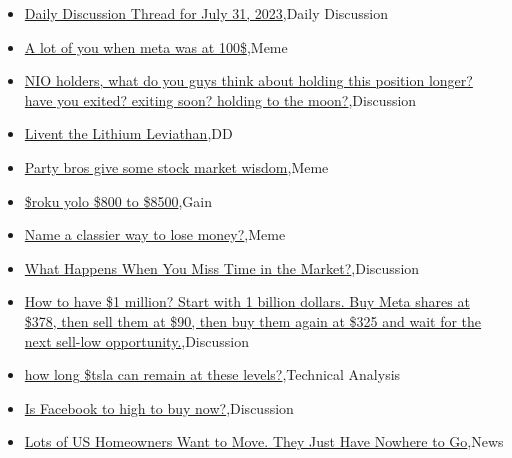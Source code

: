 \documentclass{article}%
\begin{document}
%
\begin{itemize}%
\item%
\href{https://reddit.com/r/wallstreetbets/comments/15ebthl/daily\_discussion\_thread\_for\_july\_31\_2023/}{Daily Discussion Thread for July 31, 2023},Daily Discussion%
\item%
\href{https://reddit.com/r/wallstreetbets/comments/15ebn6h/a\_lot\_of\_you\_when\_meta\_was\_at\_100/}{A lot of you when meta was at 100\$},Meme%
\item%
\href{https://reddit.com/r/wallstreetbets/comments/15e99un/nio\_holders\_what\_do\_you\_guys\_think\_about\_holding/}{NIO holders, what do you guys think about holding this position longer? have you exited? exiting soon? holding to the moon?},Discussion%
\item%
\href{https://reddit.com/r/wallstreetbets/comments/15e790o/livent\_the\_lithium\_leviathan/}{Livent the Lithium Leviathan},DD%
\item%
\href{https://reddit.com/r/wallstreetbets/comments/15e4hw4/party\_bros\_give\_some\_stock\_market\_wisdom/}{Party bros give some stock market wisdom},Meme%
\item%
\href{https://reddit.com/r/wallstreetbets/comments/15e37xv/roku\_yolo\_800\_to\_8500/}{\$roku yolo \$800 to \$8500},Gain%
\item%
\href{https://reddit.com/r/wallstreetbets/comments/15e20g3/name\_a\_classier\_way\_to\_lose\_money/}{Name a classier way to lose money?},Meme%
\item%
\href{https://reddit.com/r/StockMarket/comments/15dxka8/what\_happens\_when\_you\_miss\_time\_in\_the\_market/}{What Happens When You Miss Time in the Market?},Discussion%
\item%
\href{https://reddit.com/r/StockMarket/comments/15du4x8/how\_to\_have\_1\_million\_start\_with\_1\_billion/}{How to have \$1 million? Start with 1 billion dollars. Buy Meta shares at \$378, then sell them at \$90, then buy them again at \$325 and wait for the next sell-low opportunity.},Discussion%
\item%
\href{https://reddit.com/r/StockMarket/comments/15du4wy/how\_long\_tsla\_can\_remain\_at\_these\_levels/}{how long \$tsla can remain at these levels?},Technical Analysis%
\item%
\href{https://reddit.com/r/StockMarket/comments/15dpksn/is\_facebook\_to\_high\_to\_buy\_now/}{Is Facebook to high to buy now?},Discussion%
\item%
\href{https://reddit.com/r/Economics/comments/15dz3q2/lots\_of\_us\_homeowners\_want\_to\_move\_they\_just\_have/}{Lots of US Homeowners Want to Move. They Just Have Nowhere to Go},News%

\end{itemize}
\end{document}
